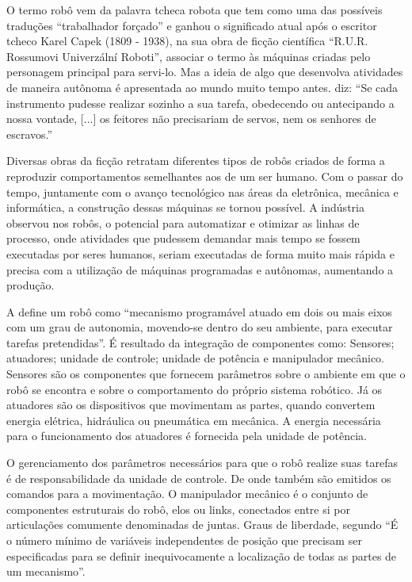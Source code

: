 O termo robô vem da palavra tcheca robota que tem como uma das possíveis traduções “trabalhador forçado” e ganhou o significado atual após o escritor tcheco Karel Capek (1809 - 1938), na sua obra de ficção científica “R.U.R. Rossumovi Univerzální Roboti”, associar o termo às máquinas criadas pelo personagem principal para servi-lo. Mas a ideia de algo que desenvolva atividades de maneira autônoma é apresentada ao mundo muito tempo antes. \cite{aristoteles1985traduccao} diz: “Se cada instrumento pudesse realizar sozinho a sua tarefa, obedecendo ou antecipando a nossa vontade, [...] os feitores não precisariam de servos, nem os senhores de escravos.” 

Diversas obras da ficção retratam diferentes tipos de robôs criados de forma a reproduzir comportamentos semelhantes aos de um ser humano. Com o passar do tempo, juntamente com o avanço tecnológico nas áreas da eletrônica, mecânica e informática, a construção dessas máquinas se tornou possível. A indústria observou nos robôs, o potencial para automatizar e otimizar as linhas de processo, onde atividades que pudessem demandar mais tempo se fossem executadas por seres humanos, seriam executadas de forma muito mais rápida e precisa com a utilização de máquinas programadas e autônomas, aumentando a produção.

A \cite{iso2012} define um robô como “mecanismo programável atuado em dois ou mais eixos com um grau de autonomia, movendo-se dentro do seu ambiente, para executar tarefas pretendidas”. É resultado da integração de componentes como: Sensores; atuadores; unidade de controle; unidade de potência e manipulador mecânico. Sensores são os componentes que fornecem parâmetros sobre o ambiente em que o robô se encontra e sobre o comportamento do próprio sistema robótico. Já os atuadores são os dispositivos que movimentam as partes, quando convertem energia elétrica, hidráulica ou pneumática em mecânica. A energia necessária para o funcionamento dos atuadores é fornecida pela unidade de potência.

O gerenciamento dos parâmetros necessários para que o robô realize suas tarefas é de responsabilidade da unidade de controle. De onde também são emitidos os comandos para a movimentação. O manipulador mecânico é o conjunto de componentes estruturais do robô, elos ou links, conectados entre si por articulações comumente denominadas de juntas. Graus de liberdade, segundo \cite{romanorobotica} “É o número mínimo de variáveis independentes de posição que precisam ser especificadas para se definir inequivocamente a localização de todas as partes de um mecanismo”.

